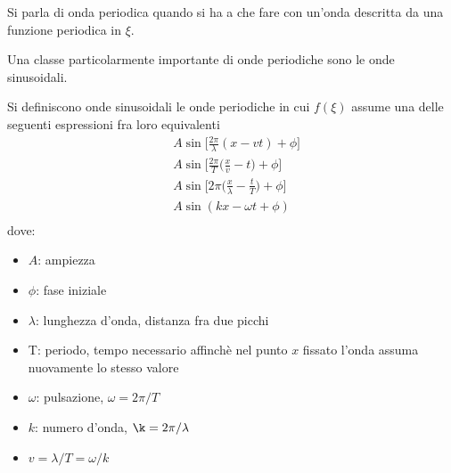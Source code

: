 \begin{defn}
    Si parla di onda periodica quando si ha a che fare con un'onda descritta da una
    funzione periodica in $\xi$.
\end{defn}
Una classe particolarmente importante di onde periodiche sono le onde sinusoidali.
\begin{defn}
    Si definiscono onde sinusoidali le onde periodiche in cui $f(\xi)$ assume una delle seguenti
    espressioni fra loro equivalenti
    \[
        \begin{split}
            & A\sin\Biggl[\frac{2\pi}{\lambda}(x-vt)+\phi\Biggr]\\
            & A\sin\Biggl[\frac{2\pi}{T}\Biggl(\frac{x}{v}-t\Biggr)+\phi\Biggr]\\
            & A\sin\Biggl[2\pi\Biggl(\frac{x}{\lambda}-\frac{t}{T}\Biggr)+\phi\Biggr]\\
            & A\sin(kx-\omega t + \phi)\\
        \end{split}
    \]
    dove:
    \begin{itemize}
            \item $A$: ampiezza
            \item $\phi$: fase iniziale
            \item $\lambda$: lunghezza d'onda, distanza fra due picchi
            \item T: periodo, tempo necessario affinchè nel punto $x$ fissato l'onda assuma nuovamente lo stesso valore
            \item $\omega$: pulsazione, $\omega=2\pi/T$
            \item $k$: numero d'onda, $\k=2\pi/\lambda$
            \item $v=\lambda/T=\omega/k$
    \end{itemize}
\end{defn}
